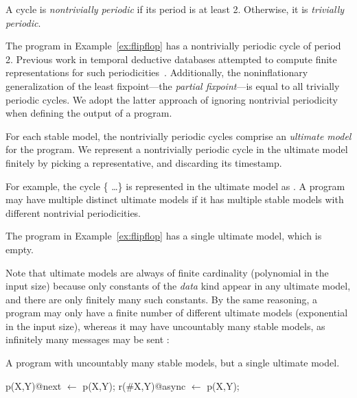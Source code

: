 \begin{definition}
A cycle is {\em nontrivially periodic} if its period is at least 2.  Otherwise, it is {\em trivially periodic}.
\end{definition}

The program in Example~\ref{ex:flipflop} has a nontrivially periodic cycle of period 2.  Previous work in temporal deductive databases attempted to compute finite representations for such periodicities~\cite{tdd-infinite}.  Additionally, the noninflationary generalization of the least fixpoint---the {\em partial fixpoint}---is equal to all trivially periodic cycles.  We adopt the latter approach of ignoring nontrivial periodicity when defining the output of a \lang program.

\begin{definition}
For each stable model, the nontrivially  periodic cycles comprise an {\em ultimate model} for the program.  We represent a nontrivially periodic cycle in the ultimate model finitely by picking a representative, and discarding its timestamp.
\end{definition}

For example, the cycle \{ \ldots\} is represented in the ultimate model as .  A program may have multiple distinct ultimate models if it has multiple stable models with different nontrivial periodicities.

The program in Example~\ref{ex:flipflop} has a single ultimate model, which is empty.

Note that ultimate models are always of finite cardinality (polynomial in the input size) because only constants of the {\em data} kind appear in any ultimate model, and there are only finitely many such constants.  By the same reasoning, a \lang program may only have a finite number of different ultimate models (exponential in the input size), whereas it may have uncountably many stable models, as infinitely many messages may be sent :

\begin{example}
A \lang program with uncountably many stable models, but a single ultimate model.

\begin{Dedalus}
p(X,Y)@next \(\leftarrow\) p(X,Y);
r(#X,Y)@async \(\leftarrow\) p(X,Y);
\end{Dedalus}
\end{example}

